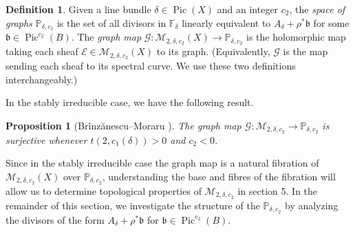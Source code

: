 \documentclass{article}[12pt]
\newtheorem{proposition}[theorem]{Proposition}
\theoremstyle{definition}
\newtheorem{definition}[theorem]{Definition}
\theoremstyle{remark}
\numberwithin{equation}{section}
\newcommand \mc{\mathcal}
\newcommand \mb{\mathbb}
\newcommand \mf{\mathfrak}
\DeclareMathOperator{\Pic}{Pic}
\begin{document}
\begin{definition}
	Given a line bundle $\delta \in \Pic(X)$ and an integer $c_2$, the \emph{space of graphs} $\mb{P}_{\delta,c_2}$ is the set of all divisors in $\mb{F}_\delta$ linearly equivalent to $A_\delta +\rho^*\mf{b}$ for some $\mf{b} \in \Pic^{c_2}(B)$. The \emph{graph map} $\mc{G}:\mc{M}_{2,\delta,c_2}(X)\to \mb{P}_{\delta,c_2}$ is the holomorphic map taking each sheaf $\mc{E} \in \mc{M}_{2,\delta,c_2}(X)$ to its graph. (Equivalently, $\mc{G}$ is the map sending each sheaf to its spectral curve. We use these two definitions interchangeably.)
\end{definition}
In the stably irreducible case, we have the following result.
\begin{proposition}[Br\^inz\u anescu--Moraru \cite{BrMor2}]\label{surjective}
	The graph map $\mc{G}:\mc{M}_{2,\delta,c_2}\to \mb{P}_{\delta,c_2}$ is surjective whenever $t(2,c_1(\delta))>0$ and $c_2<0$.
\end{proposition}
Since in the stably irreducible case the graph map is a natural fibration of $\mc{M}_{2,\delta,c_2}(X)$ over $\mb{P}_{\delta,c_2}$, understanding the base and fibres of the fibration will allow us to determine topological properties of $\mc{M}_{2,\delta,c_2}$ in section 5. In the remainder of this section, we investigate the structure of the $\mb{P}_{\delta,c_2}$ by analyzing the divisors of the form $A_\delta+\rho^*\mf{b}$ for $\mf{b} \in \Pic^{c_2}(B)$.
\end{document}
